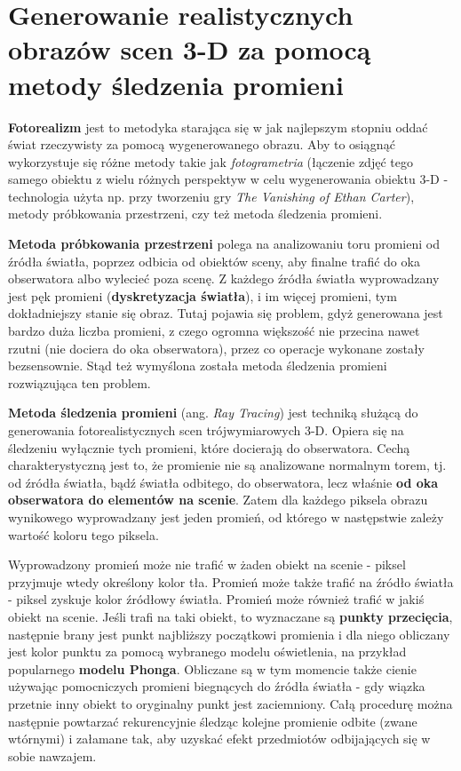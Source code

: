 \section{Generowanie realistycznych obrazów scen 3-D za pomocą metody śledzenia promieni}

\textbf{Fotorealizm} jest to metodyka starająca się w jak najlepszym stopniu oddać świat rzeczywisty za pomocą wygenerowanego obrazu. Aby to osiągnąć wykorzystuje się różne metody takie jak \textit{fotogrametria} (łączenie zdjęć tego samego obiektu z wielu różnych perspektyw w celu wygenerowania obiektu 3-D - technologia użyta np. przy tworzeniu gry \textit{The Vanishing of Ethan Carter}), metody próbkowania przestrzeni, czy też metoda śledzenia promieni. 

\textbf{Metoda próbkowania przestrzeni} polega na analizowaniu toru promieni od źródła światła, poprzez odbicia od obiektów sceny, aby finalne trafić do oka obserwatora albo wylecieć poza scenę. Z każdego źródła światła wyprowadzany jest pęk promieni (\textbf{dyskretyzacja światła}), i im więcej promieni, tym dokładniejszy stanie się obraz. Tutaj pojawia się problem, gdyż generowana jest bardzo duża liczba promieni, z czego ogromna większość nie przecina nawet rzutni (nie dociera do oka obserwatora), przez co operacje wykonane zostały bezsensownie. Stąd też wymyślona została metoda śledzenia promieni rozwiązująca ten problem.

\textbf{Metoda śledzenia promieni} (ang. \textit{Ray Tracing}) jest techniką służącą do generowania fotorealistycznych scen trójwymiarowych 3-D. Opiera się na śledzeniu wyłącznie tych promieni, które docierają do obserwatora. Cechą charakterystyczną jest to, że promienie nie są analizowane normalnym torem, tj. od źródła światła, bądź światła odbitego, do obserwatora, lecz właśnie \textbf{od oka obserwatora do elementów na scenie}. Zatem dla każdego piksela obrazu wynikowego wyprowadzany jest jeden promień, od którego w następstwie zależy wartość koloru tego piksela.

Wyprowadzony promień może nie trafić w żaden obiekt na scenie - piksel przyjmuje wtedy określony kolor tła. Promień może także trafić na źródło światła - piksel zyskuje kolor źródłowy światła. Promień może również trafić w jakiś obiekt na scenie. Jeśli trafi na taki obiekt, to wyznaczane są \textbf{punkty przecięcia}, następnie brany jest punkt najbliższy początkowi promienia i dla niego obliczany jest kolor punktu za pomocą wybranego modelu oświetlenia, na przykład popularnego \textbf{modelu Phonga}. Obliczane są w tym momencie także cienie używając pomocniczych promieni biegnących do źródła światła - gdy wiązka przetnie inny obiekt to oryginalny punkt jest zaciemniony. Całą procedurę można następnie powtarzać rekurencyjnie śledząc kolejne promienie odbite (zwane wtórnymi) i załamane tak, aby uzyskać efekt przedmiotów odbijających się w sobie nawzajem.

